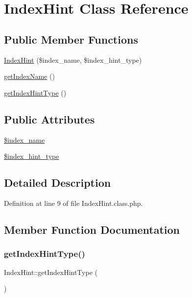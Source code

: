 \hypertarget{classIndexHint}{}\section{Index\+Hint Class Reference}
\label{classIndexHint}
\subsection*{Public Member Functions}
\begin{DoxyCompactItemize}
\item 
\hyperlink{classIndexHint_a31e42ec769a024c036e4f425fc0989cf}{Index\+Hint} (\$index\+\_\+name, \$index\+\_\+hint\+\_\+type)
\item 
\hyperlink{classIndexHint_a2e70ba0a6a8059eacec611a6e3a1fbff}{get\+Index\+Name} ()
\item 
\hyperlink{classIndexHint_afcf5b8d00ff142f4f1328c434ee5f344}{get\+Index\+Hint\+Type} ()
\end{DoxyCompactItemize}
\subsection*{Public Attributes}
\begin{DoxyCompactItemize}
\item 
\hyperlink{classIndexHint_a72e2ec1c8ae97c974642bf4342febc60}{\$index\+\_\+name}
\item 
\hyperlink{classIndexHint_a04d23166dfd4b7490a69b678e2826a32}{\$index\+\_\+hint\+\_\+type}
\end{DoxyCompactItemize}


\subsection{Detailed Description}


Definition at line 9 of file Index\+Hint.\+class.\+php.



\subsection{Member Function Documentation}
\hypertarget{classIndexHint_afcf5b8d00ff142f4f1328c434ee5f344}{}\label{classIndexHint_afcf5b8d00ff142f4f1328c434ee5f344} 
\subsubsection{\texorpdfstring{get\+Index\+Hint\+Type()}{getIndexHintType()}}
{\footnotesize\ttfamily Index\+Hint\+::get\+Index\+Hint\+Type (\begin{DoxyParamCaption}{ }\end{DoxyParamCaption})}



